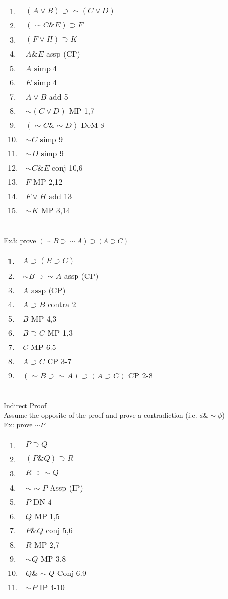 \begin{tabular}{cl}
    1. & $(A\vee B)\supset\sim(C\vee D)$\\
    2. & $(\sim C\& E)\supset F$\\
    3. & $(F\vee H)\supset K$\\
    \hline
    4. & $A\& E$ assp (CP)\\
    5. & $A$ simp 4\\
    6. & $E$ simp 4\\
    7. & $A\vee B$ add 5\\
    8. & $\sim(C\vee D)$ MP 1,7\\
    9. & $(\sim C\&\sim D)$ DeM 8\\
    10. & $\sim C$ simp 9\\
    11. & $\sim D$ simp 9\\
    12. & $\sim C\& E$ conj 10,6\\
    13. & $F$ MP 2,12\\
    14. & $F\vee H$ add 13\\
    15. & $\sim K$ MP 3,14
\end{tabular}\\
Ex3: prove $(\sim B\supset\sim A)\supset(A\supset C)$\\
\begin{tabular}{cl}
    1. & $A\supset(B\supset C)$\\
    \hline
    2. & $\sim B\supset\sim A$ assp (CP)\\
    3. & $A$ assp (CP)\\
    4. & $A\supset B$ contra 2\\
    5. & $B$ MP 4,3\\
    6. & $B\supset C$ MP 1,3\\
    7. & $C$ MP 6,5\\
    8. & $A\supset C$ CP 3-7\\
    9. & $(\sim B\supset\sim A)\supset(A\supset C)$ CP 2-8
\end{tabular}\\

Indirect Proof\\
Assume the opposite of the proof and prove a contradiction (i.e. $\phi\&\sim\phi$)\\
Ex: prove $\sim P$\\
\begin{tabular}{cl}
    1. & $P\supset Q$\\
    2. & $(P\& Q)\supset R$\\
    3. & $R\supset \sim Q$\\
    \hline
    4. & $\sim\sim P$ Assp (IP)\\
    5. & $P$ DN 4\\
    6. & $Q$ MP 1,5\\
    7. & $P\& Q$ conj 5,6\\
    8. & $R$ MP 2,7\\
    9. & $\sim Q$ MP 3.8\\
    10. & $Q\&\sim Q$ Conj 6.9\\
    11. & $\sim P$ IP 4-10
\end{tabular}
